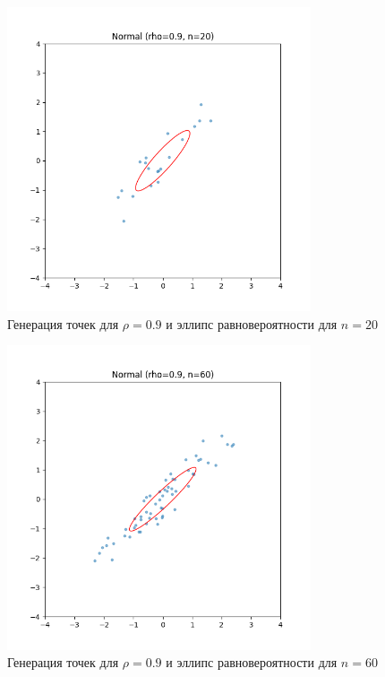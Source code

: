 \documentclass[a4paper]{article}
\begin{document}
    \begin{figure}[H]
        \centering
        \includegraphics[width=0.8\textwidth]{./plots/normal_rho0.9_n20}
        \caption{Генерация точек для $\rho = 0.9$ и эллипс равновероятности для $n=20$}
        \label{fig:normal_rho0.9_n20}
    \end{figure}

    \begin{figure}[H]
        \centering
        \includegraphics[width=0.8\textwidth]{./plots/normal_rho0.9_n60}
        \caption{Генерация точек для $\rho = 0.9$ и эллипс равновероятности для $n=60$}
        \label{fig:normal_rho0.9_n60}
    \end{figure}
\end{document}
